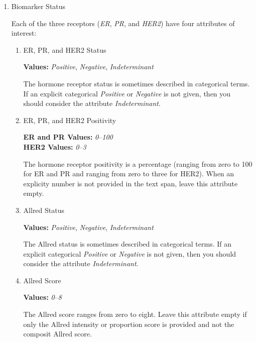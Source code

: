 \documentclass[letterpaper]{article}
\newcommand{\prefixDeep}[3]{%
  #1 %
  \tikz[baseline={([yshift={-\ht\strutbox}]a\x.north)},outer sep=0pt,inner sep=0pt]{%
    \node[align=center] (a\x) {%
      \strut \hl{#2}};%
  } %
  #3
}
\newcommand{\suffixDeep}{%
  \tikz[overlay]{ \draw[<->,thick] (b\x.west) -| (a\x.south); }%
  \pgfmathparse{int(\x+1)}%
  \xdef\x{\pgfmathresult}%
}
\newcommand{\twoDeep}[4]{%
  \begin{flushright}
  \tikz{
    \node[attrbox,align=right] (b\x) {%
      #1:  #2\\%
      #3:  #4%
    };%
  }
  \end{flushright}
  \suffixDeep
}
\newcommand{\ecog}[2]{\twoDeep{ECOG}{#1}{Historical}{#2}}
\begin{document}
\begin{enumerate}
  
\item
  Biomarker Status

  Each of the three receptors (\textsl{ER}, \textsl{PR}, and \textsl{HER2}) have four attributes of interest:
  \begin{enumerate}
  \item
    ER, PR, and HER2 Status

    \textbf{Values:}  \textsl{Positive}, \textsl{Negative}, \textsl{Indeterminant}

    The hormone receptor status is sometimes described in categorical terms.
    If an explicit categorical \textsl{Positive} or \textsl{Negative} is not given, then you should consider the attribute \textsl{Indeterminant}.
    
  \item
    ER, PR, and HER2 Positivity

    \textbf{ER and PR Values:}  \textsl{0}--\textsl{100} \\
    \textbf{HER2 Values:}  \textsl{0}--\textsl{3}

    The hormone receptor positivity is a percentage (ranging from zero to 100 for ER and PR and ranging from zero to three for HER2).
    When an explicity number is not provided in the text span, leave this attribute empty.
    
  \item
    Allred Status

    \textbf{Values:}  \textsl{Positive}, \textsl{Negative}, \textsl{Indeterminant}

    The Allred status is sometimes described in categorical terms.
    If an explicit categorical \textsl{Positive} or \textsl{Negative} is not given, then you should consider the attribute \textsl{Indeterminant}.
    
  \item
    Allred Score

    \textbf{Values:}  \textsl{0}--\textsl{8}
    
    The Allred score ranges from zero to eight.
    Leave this attribute empty if only the Allred intensity or proportion score is provided and not the composit Allred score.
    

\end{enumerate}
\end{enumerate}
\end{document}
